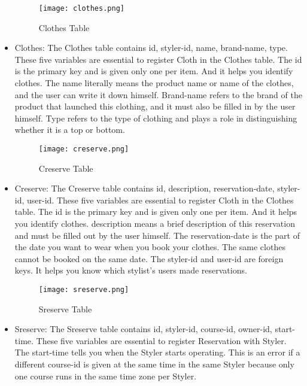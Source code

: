 \documentclass[conference]{IEEEtran}
\begin{document}
\begin{itemize}
    \begin{figure}[htbp]
    \centerline{\texttt{[image: clothes.png]}}
    \label{fig}
    \caption{Clothes Table}
    \end{figure}
    \item Clothes: The Clothes table contains id, styler-id, name, brand-name, type. These five variables are essential to register Cloth in the Clothes table. The id is the primary key and is given only one per item. And it helps you identify clothes. The name literally means the product name or name of the clothes, and the user can write it down himself. Brand-name refers to the brand of the product that launched this clothing, and it must also be filled in by the user himself. Type refers to the type of clothing and plays a role in distinguishing whether it is a top or bottom.\\

\newpage
    \begin{figure}[htbp]
    \centerline{\texttt{[image: creserve.png]}}
    \label{fig}
    \caption{Creserve Table}
    \end{figure}
    \item Creserve: The Creserve table contains id, description, reservation-date, styler-id, user-id. These five variables are essential to register Cloth in the Clothes table. The id is the primary key and is given only one per item. And it helps you identify clothes. description means a brief description of this reservation and must be filled out by the user himself. The reservation-date is the part of the date you want to wear when you book your clothes. The same clothes cannot be booked on the same date. The styler-id and user-id are foreign keys. It helps you know which stylist's users made reservations.\\
    
    \begin{figure}[htbp]
    \centerline{\texttt{[image: sreserve.png]}}
    \label{fig}
    \caption{Sreserve Table}
    \end{figure}
    \item Sreserve: The Sreserve table contains id, styler-id, course-id, owner-id, start-time. These five variables are essential to register Reservation with Styler. The start-time tells you when the Styler starts operating. This is an error if a different course-id is given at the same time in the same Styler because only one course runs in the same time zone per Styler.\\
    

\end{itemize}
\end{document}
